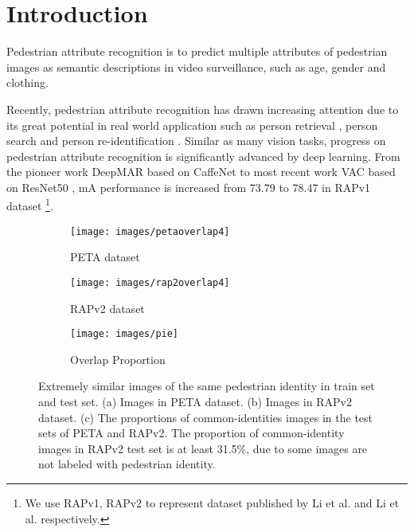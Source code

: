\documentclass[runningheads]{llncs}
\begin{document}
\section{Introduction}
Pedestrian attribute recognition \cite{zhu2013pedestrian} is to predict multiple attributes of pedestrian images as semantic descriptions in video surveillance, such as age, gender and clothing. 

Recently, pedestrian attribute recognition has drawn increasing attention due to its great potential in real world application such as person retrieval \cite{li2018richly}, person search \cite{feris2014attribute} and person re-identification \cite{yang2019towards,lin2019improving}. Similar as many vision tasks, progress on pedestrian attribute recognition is significantly advanced by deep learning. From the pioneer work DeepMAR \cite{li2015deepmar} based on CaffeNet \cite{donahue2014decaf} to most recent work VAC \cite{guo2019visual} based on ResNet50 \cite{he2016deep}, mA performance is increased from 73.79 to 78.47 in RAPv1 \cite{li2016richly} dataset \footnote{We use RAPv1, RAPv2 to represent dataset published by Li et al. \cite{li2016richly} and Li et al. \cite{li2018richly} respectively.}. 
 \begin{figure}
	\centering
	\begin{subfigure}[b]{0.26\linewidth}
         \centering
         \texttt{[image: images/petaoverlap4]}
         \caption{PETA dataset}
         \label{fig:overlap_id1}
         
     \end{subfigure}
     \hfill
     \begin{subfigure}[b]{0.26\linewidth}
         \centering
         \texttt{[image: images/rap2overlap4]}
         \caption{RAPv2 dataset}
         \label{fig:overlap_id2}
     \end{subfigure}
     \hfil
     \begin{subfigure}[b]{0.46\linewidth}
         \centering
         \texttt{[image: images/pie]}
         \caption{Overlap Proportion}
         \label{fig:overlap_id3}
     \end{subfigure}
     
     \caption{Extremely similar images of the same pedestrian identity in train set and test set. (a) Images in PETA dataset. (b) Images in RAPv2 dataset. (c) The proportions of common-identities images in the test sets of PETA and RAPv2. The proportion of common-identity images in RAPv2 test set is at least 31.5\%, due to some images are not labeled with pedestrian identity.}
     \label{fig:overlap_id}
\end{figure}
\end{document}
